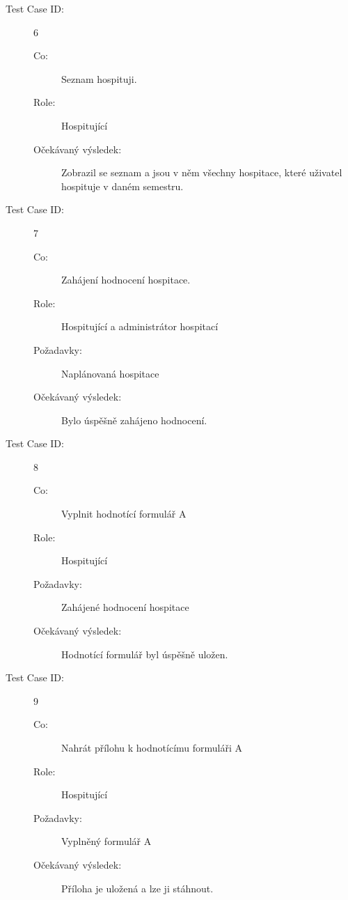 \begin{description}
\item[Test Case ID:] 6
\begin{description}
\item[Co:] Seznam hospituji.
\item[Role:] Hospitující
\item[Očekávaný výsledek:] Zobrazil se seznam a jsou v něm všechny hospitace, které uživatel hospituje v daném semestru.
\end{description}
\end{description}

\begin{description}
\item[Test Case ID:] 7
\begin{description}
\item[Co:] Zahájení hodnocení hospitace.
\item[Role:] Hospitující a administrátor hospitací
\item[Požadavky:] Naplánovaná hospitace
\item[Očekávaný výsledek:] Bylo úspěšně zahájeno hodnocení.
\end{description}
\end{description}

\begin{description}
\item[Test Case ID:] 8
\begin{description}
\item[Co:] Vyplnit hodnotící formulář A
\item[Role:] Hospitující
\item[Požadavky:] Zahájené hodnocení hospitace
\item[Očekávaný výsledek:] Hodnotící formulář byl úspěšně uložen.
\end{description}
\end{description}

\begin{description}
\item[Test Case ID:] 9
\begin{description}
\item[Co:] Nahrát přílohu k hodnotícímu formuláři A
\item[Role:] Hospitující
\item[Požadavky:] Vyplněný formulář A
\item[Očekávaný výsledek:] Příloha je uložená a lze ji stáhnout.
\end{description}
\end{description}

